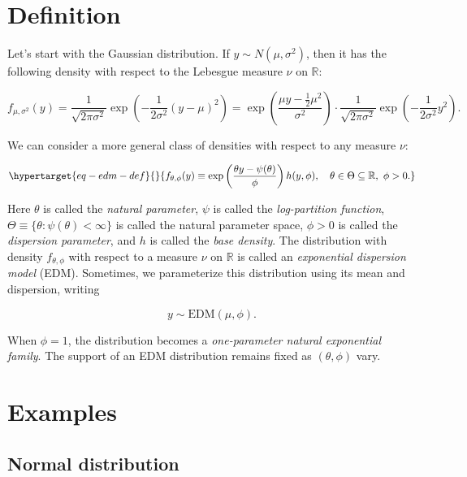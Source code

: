 \documentclass[
  11pt,
  letterpaper,
  oneside]{book}
\theoremstyle{definition}
\theoremstyle{plain}
\theoremstyle{plain}
\theoremstyle{plain}
\theoremstyle{remark}
\begin{document}
\hypertarget{definition}{%
\section{Definition}\label{definition}}

Let's start with the Gaussian distribution. If
\(y \sim N(\mu, \sigma^2)\), then it has the following density with
respect to the Lebesgue measure \(\nu\) on \(\mathbb{R}\):

\[
f_{\mu, \sigma^2}(y) = \frac{1}{\sqrt{2\pi \sigma^2}}\exp\left(-\frac{1}{2\sigma^2}(y-\mu)^2\right) = \exp\left(\frac{\mu y - \frac{1}{2}\mu^2}{\sigma^2}\right) \cdot \frac{1}{\sqrt{2\pi \sigma^2}}\exp\left(-\frac1{2\sigma^2} y^2\right).
\]

We can consider a more general class of densities with respect to any
measure \(\nu\):

\begin{equation}\protect\hypertarget{eq-edm-def}{}{
f_{\theta, \phi}(y) \equiv \exp\left(\frac{\theta y - \psi(\theta)}{\phi}\right)h(y, \phi), \quad \theta \in \Theta \subseteq \mathbb{R}, \ \phi > 0.
}\label{eq-edm-def}\end{equation}

Here \(\theta\) is called the \emph{natural parameter}, \(\psi\) is
called the \emph{log-partition function},
\(\Theta \equiv \{\theta: \psi(\theta) < \infty\}\) is called the
natural parameter space, \(\phi > 0\) is called the \emph{dispersion
parameter}, and \(h\) is called the \emph{base density}. The
distribution with density \(f_{\theta, \phi}\) with respect to a measure
\(\nu\) on \(\mathbb{R}\) is called an \emph{exponential dispersion
model} (EDM). Sometimes, we parameterize this distribution using its
mean and dispersion, writing

\[
y \sim \text{EDM}(\mu, \phi).
\]

When \(\phi = 1\), the distribution becomes a \emph{one-parameter
natural exponential family}. The support of an EDM distribution remains
fixed as \((\theta, \phi)\) vary.

\hypertarget{examples}{%
\section{Examples}\label{examples}}

\hypertarget{normal-distribution}{%
\subsection{Normal distribution}\label{normal-distribution}}
\end{document}
